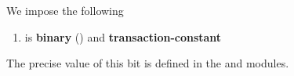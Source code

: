 We impose the following
\begin{enumerate}
    \item
	\rlpTxnSharedColumnRequiresEvmExecution{} is \textbf{binary} (\sanityCheck)
	and \textbf{transaction-constant}
\end{enumerate}
\saNote{}
The precise value of this bit is defined in the
\userTxnDataMod{} and \hubMod{} modules.
